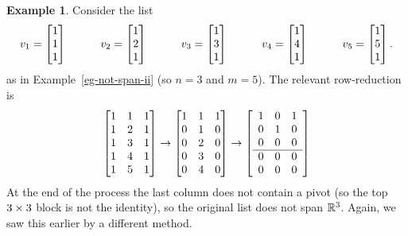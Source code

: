 \documentclass[reqno]{amsart}
\theoremstyle{definition}
\newtheorem{example}[theorem]{Example}
\begin{document}
\begin{example}\label{eg-not-span-ii-matrix}
 Consider the list
 \[ v_1 = \left[\begin{matrix} 1 \\ 1 \\ 1 \end{matrix}\right] \hspace{3em}
    v_2 = \left[\begin{matrix} 1 \\ 2 \\ 1 \end{matrix}\right] \hspace{3em}
    v_3 = \left[\begin{matrix} 1 \\ 3 \\ 1 \end{matrix}\right] \hspace{3em}
    v_4 = \left[\begin{matrix} 1 \\ 4 \\ 1 \end{matrix}\right] \hspace{3em}
    v_5 = \left[\begin{matrix} 1 \\ 5 \\ 1 \end{matrix}\right].
 \]
 as in Example~\ref{eg-not-span-ii} (so $n=3$ and $m=5$).  The
 relevant row-reduction is
 \[
  \left[\begin{matrix} 1 & 1 & 1 \\ 1 & 2 & 1 \\ 1 & 3 & 1 \\ 1 & 4 & 1 \\ 1 & 5 & 1 \end{matrix}\right]
  \to
  \left[\begin{matrix} 1 & 1 & 1 \\ 0 & 1 & 0 \\ 0 & 2 & 0 \\ 0 & 3 & 0 \\ 0 & 4 & 0 \end{matrix}\right]
  \to
  \left[\begin{array}{ccc}
   1 & 0 & 1 \\
   0 & 1 & 0 \\
   0 & 0 & 0 \\ \hline
   0 & 0 & 0 \\
   0 & 0 & 0 
  \end{array}\right]
 \]
 At the end of the process the last column does not contain a pivot
 (so the top $3\times 3$ block is not the identity),
 so the original list does not span ${\mathbb{R}}^3$.  Again, we saw this earlier by a
 different method.
\end{example}
\end{document}
